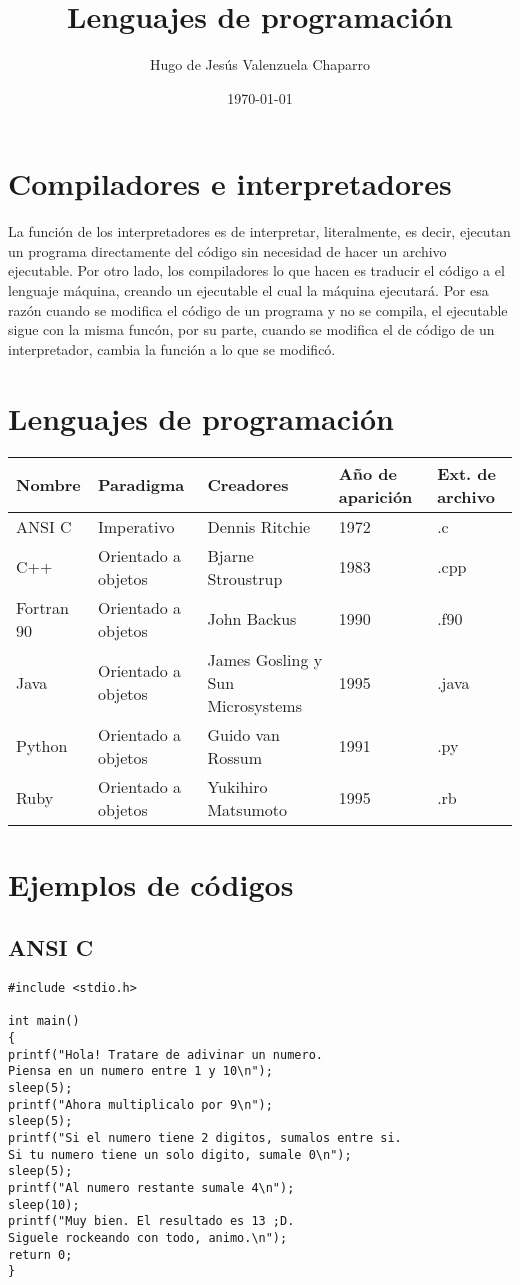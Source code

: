 \documentclass[notitlepage,12pt]{article}
\title{Lenguajes de programaci\'on}
\author{Hugo de Jes\'us Valenzuela Chaparro}
\date{\today}
\begin{document}
\maketitle

\section{Compiladores e interpretadores}
La funci\'on de los {\color{blue} interpretadores} es de interpretar, literalmente, es decir, ejecutan un programa directamente del c\'odigo sin necesidad de hacer un archivo ejecutable. Por otro lado, los {\color{red} compiladores} lo que hacen es traducir el c\'odigo a el lenguaje m\'aquina, creando un ejecutable el cual la m\'aquina ejecutar\'a. Por esa raz\'on cuando se modifica el c\'odigo de un programa y no se compila, el ejecutable sigue con la misma func\'on, por su parte, cuando se modifica el de c\'odigo de un interpretador, cambia la funci\'on a lo que se modific\'o.

\section{Lenguajes de programaci\'on}
\begin{tabular}{|p{2cm}|p{3cm}|p{2cm}|p{2cm}|p{1cm}|}
\hline
{\bf{Nombre}} & {\bf{Paradigma}} & {\bf{Creadores}} & {\bf{Año de aparici\'on}} & {\bf{Ext. de archivo}} \\
\hline
ANSI C & Imperativo  & Dennis Ritchie  & 1972  & .c \\
\hline
C++ & Orientado a objetos  & Bjarne Stroustrup & 1983  & .cpp \\
\hline
Fortran 90 & Orientado a objetos & John Backus & 1990 & .f90 \\
\hline
Java & Orientado a objetos & James Gosling y Sun Microsystems & 1995 & .java \\
\hline
Python & Orientado a objetos & Guido van Rossum & 1991 & .py \\
\hline
Ruby & Orientado a objetos & Yukihiro Matsumoto & 1995 & .rb \\
\hline

\end{tabular} 

\section{Ejemplos de c\'odigos}
\subsection{ANSI C}
\begin{verbatim}
#include <stdio.h>

int main()
{
printf("Hola! Tratare de adivinar un numero. 
Piensa en un numero entre 1 y 10\n");
sleep(5);
printf("Ahora multiplicalo por 9\n");
sleep(5);
printf("Si el numero tiene 2 digitos, sumalos entre si.
Si tu numero tiene un solo digito, sumale 0\n");
sleep(5);
printf("Al numero restante sumale 4\n");
sleep(10);
printf("Muy bien. El resultado es 13 ;D. 
Siguele rockeando con todo, animo.\n");
return 0;
}
\end{verbatim}
\end{document}

